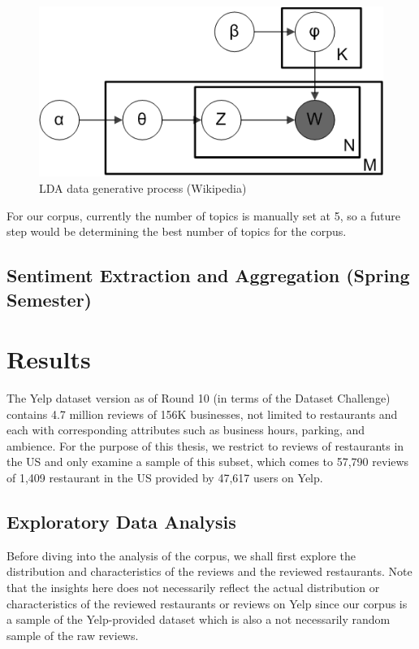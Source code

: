 \documentclass[12pt,twoside]{dukestatscithesis}
\theoremstyle{definition}
\theoremstyle{definition}
\theoremstyle{definition}
\theoremstyle{remark}
\begin{document}
\begin{figure}[htbp]
\centering
\includegraphics{figure/LDA.png}
\caption{\label{fig:LDA}LDA data generative process (Wikipedia)}
\end{figure}
For our corpus, currently the number of topics is manually set at 5, so
a future step would be determining the best number of topics for the
corpus.

\section{Sentiment Extraction and Aggregation (Spring
Semester)}\label{sentiment-extraction-and-aggregation-spring-semester}

\chapter{Results}\label{results}

The Yelp dataset version as of Round 10 (in terms of the Dataset
Challenge) contains 4.7 million reviews of 156K businesses, not limited
to restaurants and each with corresponding attributes such as business
hours, parking, and ambience. For the purpose of this thesis, we
restrict to reviews of restaurants in the US and only examine a sample
of this subset, which comes to 57,790 reviews of 1,409 restaurant in the
US provided by 47,617 users on Yelp.

\section{Exploratory Data Analysis}\label{exploratory-data-analysis}

Before diving into the analysis of the corpus, we shall first explore
the distribution and characteristics of the reviews and the reviewed
restaurants. Note that the insights here does not necessarily reflect
the actual distribution or characteristics of the reviewed restaurants
or reviews on Yelp since our corpus is a sample of the Yelp-provided
dataset which is also a not necessarily random sample of the raw
reviews.
\end{document}

